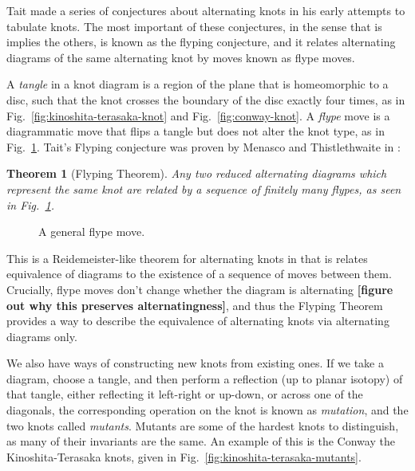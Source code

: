\documentclass[12pt]{report}
\newcommand{\noteblue}[1]{{\color{Blue} \textbf{#1}}}
\newtheorem*{theorem}{Theorem}
\begin{document}
Tait made a series of conjectures about alternating knots in his early attempts to tabulate knots. The most important of these conjectures, in the sense that is implies the others, is known as the flyping conjecture, and it relates alternating diagrams of the same alternating knot by moves known as flype moves.

A \textit{tangle} in a knot diagram is a region of the plane that is homeomorphic to a disc, such that the knot crosses the boundary of the disc exactly four times, as in Fig.~\ref{fig:kinoshita-terasaka-knot} and Fig.~\ref{fig:conway-knot}. A \textit{flype} move is a diagrammatic move that flips a tangle but does not alter the knot type, as in Fig.~\ref{fig:flype}. Tait's Flyping conjecture was proven by Menasco and Thistlethwaite in \cite[p. 166]{classification-alternating-links}:

\begin{theorem}[Flyping Theorem]
	Any two reduced alternating diagrams which represent the same knot are related by a sequence of finitely many flypes, as seen in Fig.~\ref{fig:flype}.
\end{theorem}

\begin{figure}[hbt]
	\centering
	\def\svgscale{0.5}
	
	\caption{A general flype move.}
	\label{fig:flype}
\end{figure}

This is a Reidemeister-like theorem for alternating knots in that is relates equivalence of diagrams to the existence of a sequence of moves between them. Crucially, flype moves don't change whether the diagram is alternating \noteblue{[figure out why this preserves alternatingness]}, and thus the Flyping Theorem provides a way to describe the equivalence of alternating knots via alternating diagrams only.

We also have ways of constructing new knots from existing ones. If we take a diagram, choose a tangle, and then perform a reflection (up to planar isotopy) of that tangle, either reflecting it left-right or up-down, or across one of the diagonals, the corresponding operation on the knot is known as \textit{mutation}, and the two knots called \textit{mutants}. Mutants are some of the hardest knots to distinguish, as many of their invariants are the same. An example of this is the Conway the Kinoshita-Terasaka knots, given in Fig.~\ref{fig:kinoshita-terasaka-mutants}.
\end{document}
